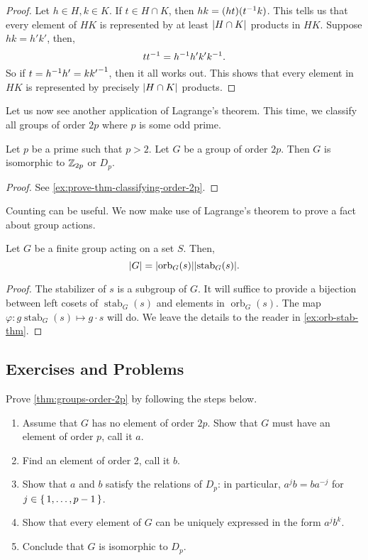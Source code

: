 \documentclass[./main.tex]{subfiles}
\begin{document}
\begin{proof}
    Let $h \in H, k\in K$. If $t \in H \cap K$, then $hk = (ht)(t^{-1} k)$. This
    tells us that every element of $HK$ is represented by at least $\abs{H \cap
    K}$ products in $HK$. Suppose $hk = h' k'$, then,
    \[
        t t^{-1} = h^{-1} h' k' k^{-1}.
    \]
    So if $t = h^{-1} h' = k {k'}^{-1}$, then it all works out. This shows that
    every element in $HK$ is represented by precisely $\abs{H \cap K}$ products.
\end{proof}


Let us now see another application of Lagrange's theorem. This time, we classify
all groups of order $2p$ where $p$ is some odd prime.
\begin{theorem}
\label{thm:groups-order-2p}
    Let $p$ be a prime such that $p > 2$. Let $G$ be a group of order $2p$. Then
    $G$ is isomorphic to $\mathbb{Z}_{2p}$ or $D_p$.
\end{theorem}
\begin{proof}
    See \cref{ex:prove-thm-classifying-order-2p}.
\end{proof}


Counting can be useful. We now make use of Lagrange's theorem to prove a fact
about group actions.
\begin{theorem}
\label{thm:orb-stab-thm}
    Let $G$ be a finite group acting on a set $S$. Then,
    \[
        \abs{G} = \abs{\operatorname{orb}_G (s)} \abs{\operatorname{stab}_G (s)}.
    \]
\end{theorem}
\begin{proof}
    The stabilizer of $s$ is a subgroup of $G$. It will suffice to provide a
    bijection between left cosets of $\operatorname{stab}_G (s)$ and elements in
    $\operatorname{orb}_G(s)$. The map $\varphi: g \operatorname{stab}_G (s) \mapsto g
    \cdot s$ will do. We leave the details to the reader in
    \cref{ex:orb-stab-thm}.
\end{proof}


\subsection{Exercises and Problems}

\begin{exercise}
\label{ex:prove-thm-classifying-order-2p}
    Prove \cref{thm:groups-order-2p} by following the steps below.
    \begin{enumerate}
        \item Assume that $G$ has no element of order $2p$. Show that $G$ must have an element of order $p$, call it $a$.
        \item Find an element of order 2, call it $b$.
        \item Show that $a$ and $b$ satisfy the relations of $D_p$: in particular, $a^j b = b a^{-j}$ for $j \in \set{1, \dots, p-1}$.
        \item Show that every element of $G$ can be uniquely expressed in the form $a^jb^k$. 
        \item Conclude that $G$ is isomorphic to $D_p$.
    \end{enumerate}
\end{exercise}
\end{document}

